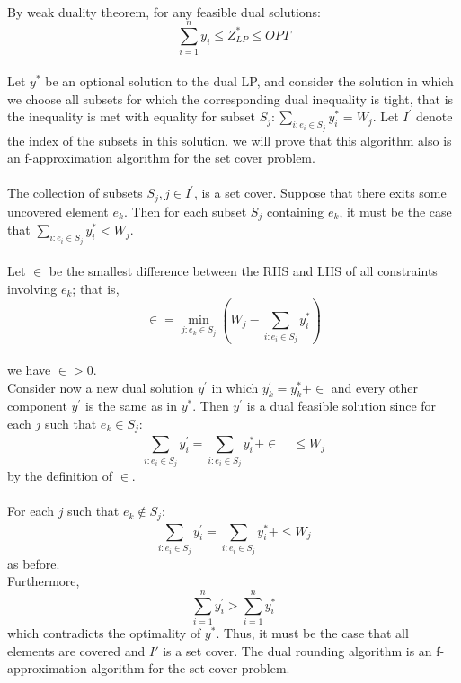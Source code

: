 \documentclass[12pt]{article}
\title{}
\author{\textsc{CS F364: Design \& Analysis of Algorithms}
\\
Lec 28, BITS Pilani}
\date{}
\begin{document}
\maketitle

\paragraph{}
By weak duality theorem, for any feasible dual solutions:
\\
$$\sum_{i=1}^{n}y_i \leq Z_{LP}^{*} \leq OPT$$
\\
Let $y^{*}$ be an optional solution to the dual LP, and consider the solution in which we choose all subsets for which the corresponding dual inequality is tight, that is the inequality is met with equality for subset $S_j: \sum_{i:e_i \in S_j}^{}y_i^{*} = W_j$. Let $I^{'}$ denote the index of the subsets in this solution. we will prove that this algorithm also is an f-approximation algorithm for the set cover problem.
\\
\\
The collection of subsets $S_j, j \in I^{'}$, is a set cover. Suppose that there exits some uncovered element $e_k$. Then for each subset $S_j$ containing $e_k$, it must be the case that $\sum_{i:e_i \in S_j}^{}y_i^{*} < W_j$.
\\
\\
Let $\in$ be the smallest difference between the RHS and LHS of all constraints involving $e_k$; that is,
$$\in = \min_{j:e_k \in S_j}^{}(W_j - \sum_{i:e_i \in S_j}^{}y_i^{*})$$ 
\\
we have $\in > 0 $.
\\
Consider now a new dual solution $y^{'}$ in which $y_k^{'} = y_k^{*} + \in$ and every other component $y^{'}$ is the same as in $y^{*}$. Then $y^{'}$ is a dual feasible solution since for each $j$ such that $e_k \in S_j$:
$$\sum_{i:e_i \in S_j}^{}y_i^{'} = \sum_{i:e_i \in S_j}^{}y_i^{*} + \in \quad \leq W_j$$ by the definition of $\in$.
\\
\\
For each $j$ such that $e_k \notin S_j$:
$$\sum_{i:e_i \in S_j}^{}y_i^{'} = \sum_{i:e_i \in S_j}^{}y_i^{*} + \leq W_j$$ as before.
\\
Furthermore, $$\sum_{i=1}^{n}y_i^{'} > \sum_{i=1}^{n}y_i^{*}$$ which contradicts the optimality of $y^{*}$. Thus, it must be the case that all elements are covered and $I'$ is a set cover. The dual rounding algorithm is an f-approximation algorithm for the set cover problem.\\
\end{document}
